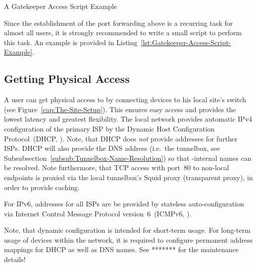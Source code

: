 \begin{algorithm}

\caption{A Gatekeeper Access Script Example}
\label{lst:Gatekeeper-Access-Script-Example}
\end{algorithm}

Since the establishment of the port forwarding above is a recurring task for almost all  users, it is strongly recommended to write a small script to perform this task. An example is provided in Listing~\ref{lst:Gatekeeper-Access-Script-Example}.



\subsection{Getting Physical Access}
\label{sub:Getting-Physical-Access}

A user can get physical access to  by connecting devices to his local site's  switch (see Figure~\ref{cap:The-Site-Setup}). This ensures easy access and provides the lowest latency and greatest flexibility.
The local network provides automatic IPv4 configuration of the primary ISP by the Dynamic Host Configuration Protocol~(DHCP, \cite{RFC2131,RFC2132}). Note, that DHCP does \emph{not} provide addresses for further ISPs. DHCP will also provide the DNS address (i.e.\ the tunnelbox, see Subsubsection~\ref{subsub:Tunnelbox-Name-Resolution}) so that -internal names can be resolved. Note furthermore, that TCP access with port~80 to non-local endpoints is proxied via the local tunnelbox's Squid proxy (transparent proxy), in order to provide caching.

For IPv6, addresses for all ISPs are be provided by stateless auto-configuration via Internet Control Message Protocol version~6~(ICMPv6, \cite{RFC4443}).

Note, that dynamic configuration is intended for short-term usage. For long-term usage of devices within the  network, it is required to configure permanent address mappings for DHCP as well as DNS names. See ******* for the maintenance details!



